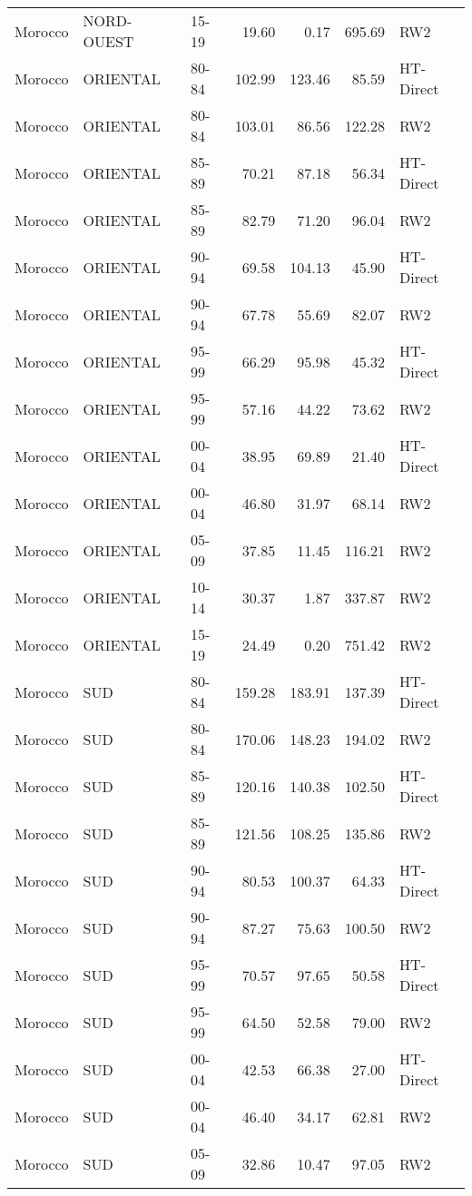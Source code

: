 \begin{longtable}{lllrrrl}
  Morocco & NORD-OUEST & 15-19 & 19.60 & 0.17 & 695.69 & RW2 \\ 
  Morocco & ORIENTAL & 80-84 & 102.99 & 123.46 & 85.59 & HT-Direct \\ 
  Morocco & ORIENTAL & 80-84 & 103.01 & 86.56 & 122.28 & RW2 \\ 
  Morocco & ORIENTAL & 85-89 & 70.21 & 87.18 & 56.34 & HT-Direct \\ 
  Morocco & ORIENTAL & 85-89 & 82.79 & 71.20 & 96.04 & RW2 \\ 
  Morocco & ORIENTAL & 90-94 & 69.58 & 104.13 & 45.90 & HT-Direct \\ 
  Morocco & ORIENTAL & 90-94 & 67.78 & 55.69 & 82.07 & RW2 \\ 
  Morocco & ORIENTAL & 95-99 & 66.29 & 95.98 & 45.32 & HT-Direct \\ 
  Morocco & ORIENTAL & 95-99 & 57.16 & 44.22 & 73.62 & RW2 \\ 
  Morocco & ORIENTAL & 00-04 & 38.95 & 69.89 & 21.40 & HT-Direct \\ 
  Morocco & ORIENTAL & 00-04 & 46.80 & 31.97 & 68.14 & RW2 \\ 
  Morocco & ORIENTAL & 05-09 & 37.85 & 11.45 & 116.21 & RW2 \\ 
  Morocco & ORIENTAL & 10-14 & 30.37 & 1.87 & 337.87 & RW2 \\ 
  Morocco & ORIENTAL & 15-19 & 24.49 & 0.20 & 751.42 & RW2 \\ 
  Morocco & SUD & 80-84 & 159.28 & 183.91 & 137.39 & HT-Direct \\ 
  Morocco & SUD & 80-84 & 170.06 & 148.23 & 194.02 & RW2 \\ 
  Morocco & SUD & 85-89 & 120.16 & 140.38 & 102.50 & HT-Direct \\ 
  Morocco & SUD & 85-89 & 121.56 & 108.25 & 135.86 & RW2 \\ 
  Morocco & SUD & 90-94 & 80.53 & 100.37 & 64.33 & HT-Direct \\ 
  Morocco & SUD & 90-94 & 87.27 & 75.63 & 100.50 & RW2 \\ 
  Morocco & SUD & 95-99 & 70.57 & 97.65 & 50.58 & HT-Direct \\ 
  Morocco & SUD & 95-99 & 64.50 & 52.58 & 79.00 & RW2 \\ 
  Morocco & SUD & 00-04 & 42.53 & 66.38 & 27.00 & HT-Direct \\ 
  Morocco & SUD & 00-04 & 46.40 & 34.17 & 62.81 & RW2 \\ 
  Morocco & SUD & 05-09 & 32.86 & 10.47 & 97.05 & RW2 \\ 

\end{longtable}
